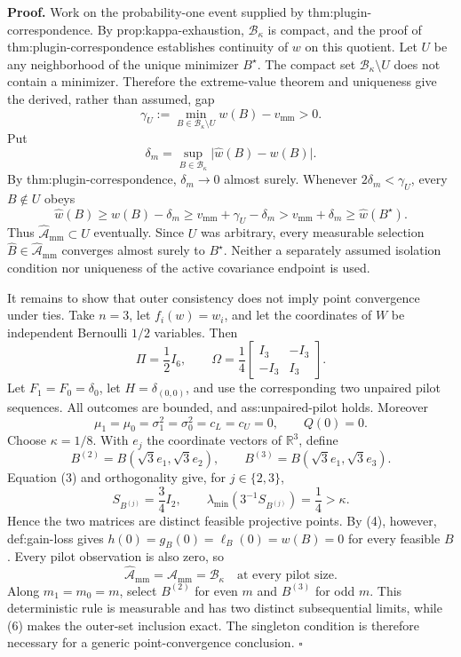 \textbf{Proof.}
Work on the probability-one event supplied by thm:plugin-correspondence.  By prop:kappa-exhaustion, \(\mathcal B_\kappa\) is compact, and the proof of thm:plugin-correspondence establishes continuity of \(w\) on this quotient.  Let \(U\) be any neighborhood of the unique minimizer \(B^\star\).  The compact set \(\mathcal B_\kappa\setminus U\) does not contain a minimizer.  Therefore the extreme-value theorem and uniqueness give the derived, rather than assumed, gap
\[
 \gamma_U:=
 \min_{B\in\mathcal B_\kappa\setminus U}w(B)-v_{\mathrm{mm}}>0.
 \tag{1}
\]
Put
\[
 \delta_m=\sup_{B\in\mathcal B_\kappa}
 \lvert\widehat w(B)-w(B)\rvert.
\]
By thm:plugin-correspondence, \(\delta_m\longrightarrow0\) almost surely.  Whenever \(2\delta_m<\gamma_U\), every \(B\notin U\) obeys
\[
 \widehat w(B)
 \ge w(B)-\delta_m
 \ge v_{\mathrm{mm}}+\gamma_U-\delta_m
 >v_{\mathrm{mm}}+\delta_m
 \ge\widehat w(B^\star).
 \tag{2}
\]
Thus \(\widehat{\mathcal A}_{\mathrm{mm}}\subset U\) eventually.  Since \(U\) was arbitrary, every measurable selection \(\widehat B\in\widehat{\mathcal A}_{\mathrm{mm}}\) converges almost surely to \(B^\star\).  Neither a separately assumed isolation condition nor uniqueness of the active covariance endpoint is used.

It remains to show that outer consistency does not imply point convergence under ties.  Take \(n=3\), let \(f_i(w)=w_i\), and let the coordinates of \(W\) be independent Bernoulli \(1/2\) variables.  Then
\[
 \Pi=\frac12I_6,
 \qquad
 \Omega=\frac14
 \begin{bmatrix}I_3&-I_3\\-I_3&I_3\end{bmatrix}.
 \tag{3}
\]
Let \(F_1=F_0=\delta_0\), let \(H=\delta_{(0,0)}\), and use the corresponding two unpaired pilot sequences.  All outcomes are bounded, and ass:unpaired-pilot holds.  Moreover
\[
 \mu_1=\mu_0=\sigma_1^2=\sigma_0^2=c_L=c_U=0,
 \qquad Q(0)=0.
 \tag{4}
\]
Choose \(\kappa=1/8\).  With \(e_j\) the coordinate vectors of \(\mathbb R^3\), define
\[
 B^{(2)}=B(\sqrt3e_1,\sqrt3e_2),
 \qquad
 B^{(3)}=B(\sqrt3e_1,\sqrt3e_3).
\]
Equation (3) and orthogonality give, for \(j\in\{2,3\}\),
\[
 S_{B^{(j)}}=\frac34I_2,
 \qquad
 \lambda_{\min}\!\left(3^{-1}S_{B^{(j)}}\right)=\frac14>\kappa.
 \tag{5}
\]
Hence the two matrices are distinct feasible projective points.  By (4), however, def:gain-loss gives \(h(0)=g_B(0)=\ell_B(0)=w(B)=0\) for every feasible \(B\).  Every pilot observation is also zero, so
\[
 \widehat{\mathcal A}_{\mathrm{mm}}
 =\mathcal A_{\mathrm{mm}}
 =\mathcal B_\kappa
 \quad\text{at every pilot size}.
 \tag{6}
\]
Along \(m_1=m_0=m\), select \(B^{(2)}\) for even \(m\) and \(B^{(3)}\) for odd \(m\).  This deterministic rule is measurable and has two distinct subsequential limits, while (6) makes the outer-set inclusion exact.  The singleton condition is therefore necessary for a generic point-convergence conclusion. \(\square\)
